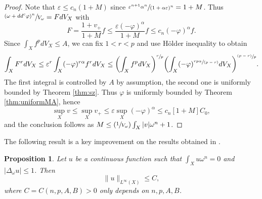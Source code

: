 \documentclass[11pt]{article}
\numberwithin{equation}{section}
\newcommand{\Psfrac}[2]{(\sfrac{#1}{#2})}
\newcommand{\psfrac}[2]{\sfrac{(#1)}{#2}}
\newcommand{\spfrac}[2]{\sfrac{#1}{(#2)}}
\newtheorem{prop}[theorem]{Proposition}
\theoremstyle{definition}
\let\e\varepsilon
\let\f\varphi
\begin{document}
\begin{proof}
Note that $\e \leq c_n (1+M)$ since $\sfrac{\e^{n+1}\alpha^n}{(1+\alpha \e)^n}=1+M$.
Thus $\sfrac{(\omega+dd^c \f)^n}{V_{\omega}}=F dV_X$
with
\[
F=\frac{1+v_+}{1+M} f \leq \frac{\e (-\f)^{\alpha}}{1+M} f \leq c_n (-\f)^{\alpha} f.
\]
Since $\int_X f^p dV_X \leq A$,
we can fix $1<r<p$ and use
Hölder inequality to obtain
\[
\int_X F^r dV_X \leq \e^r \int_X (-\f)^{r\alpha} f^r dV_X \leq
\biggl( \int_X f^p dV_X \biggr)^{\sfrac{r}{p}}
\biggl( \int_X (-\f)^{\spfrac{rp\alpha}{p-r}} dV_X \biggr)^{\psfrac{p-r}{p}}.
\]
The first integral is controlled by $A$ by assumption, the second one is uniformly bounded by Theorem \ref{thm:sz}.
Thus $\f$ is uniformly bounded by Theorem \ref{thm:uniformMA}, hence
\[
\sup_X v \leq \sup_X v_+ \leq \e \sup_X (-\f)^{\alpha} \leq c_n [1+M] C_0,
\]
and the conclusion follows as $M\leq \Psfrac{1}{V_\omega} \int_X |v| \omega^n+1$.
\end{proof}

The following result is a key improvement on the results obtained in \cite{GPSS22}.

\begin{prop} \label{prop:key}
Let $u$ be a continuous function such that $\int_X\! u \omega^n\!=\!0$
and~\hbox{$|\Delta_{\omega} u| \!\leq\! 1$}. Then
\[
\|u\|_{L^{\infty}(X)} \leq C,
\]
where $C=C(n,p,A,B)>0$ only depends on $n,p,A,B$.
\end{prop}
\end{document}
